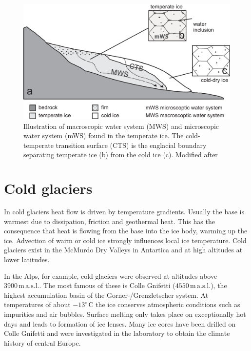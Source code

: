 \documentclass[parskip=half]{scrartcl}
\newcommand{\unit}[1]{\ensuremath{\,\mathrm{#1}}}
\newcommand{\cels}[1]{\ensuremath{#1^{\circ}\,\mathrm{C}}}
\begin{document}
 \begin{figure}[tbhp]
  \centering
  \includegraphics[width=12.cm]{figures/mws}  
  \caption{Illustration of macroscopic water system (MWS) and microscopic water system (mWS) found in the temperate ice. The cold-temperate transition surface (CTS) is the englacial boundary separating temperate ice (b) from the cold ice (c). Modified after \cite{Gusmeroli2010}}
  \label{fig:mws}
\end{figure}



\section{Cold glaciers}
\label{sec:cold-glaciers}

In cold glaciers heat flow is driven by temperature gradients.  Usually the
base is warmest due to dissipation, friction and geothermal heat.  This has
the consequence that heat is flowing from the base into the ice body, warming
up the ice.  Advection of warm or cold ice strongly influences local ice
temperature. Cold glaciers exist in the McMurdo Dry Valleys in Antartica and at high altitudes at lower latitudes. 

In the Alps, for example, cold glaciers were observed at altitudes above $3900\unit{m}\unit{a.s.l.}$.  The most famous of these is Colle
Gnifetti ($4550 \unit{m}\unit{a.s.l.}$), the highest accumulation basin of the
Gorner-/Grenzletscher system.  At temperatures of about \cels{-13} the ice
conserves atmospheric conditions such as impurities and air bubbles.  Surface
melting only takes place on exceptionally hot days and leads to formation of
ice lenses.  Many ice cores have been drilled on Colle Gnifetti and were
investigated in the laboratory to obtain the climate history of central Europe.
\end{document}
